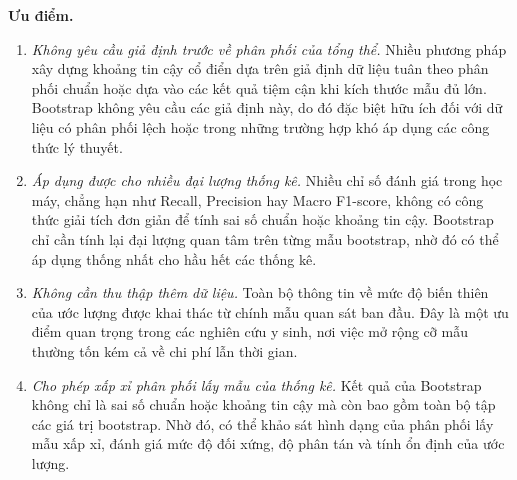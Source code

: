 \documentclass[14pt,a4paper]{extarticle}\usepackage[]{graphicx}\usepackage[]{xcolor}
\begin{document}
\textbf{Ưu điểm.}
\begin{enumerate}
  \item \emph{Không yêu cầu giả định trước về phân phối của tổng thể.}
        Nhiều phương pháp xây dựng khoảng tin cậy cổ điển dựa trên giả định
        dữ liệu tuân theo phân phối chuẩn hoặc dựa vào các kết quả tiệm cận
        khi kích thước mẫu đủ lớn. Bootstrap không yêu cầu các giả định này,
        do đó đặc biệt hữu ích đối với dữ liệu có phân phối lệch hoặc trong
        những trường hợp khó áp dụng các công thức lý thuyết.

  \item \emph{Áp dụng được cho nhiều đại lượng thống kê.} Nhiều chỉ số đánh
        giá trong học máy, chẳng hạn như Recall, Precision hay Macro F1-score,
        không có công thức giải tích đơn giản để tính sai số chuẩn hoặc khoảng
        tin cậy. Bootstrap chỉ cần tính lại đại lượng quan tâm trên từng mẫu
        bootstrap, nhờ đó có thể áp dụng thống nhất cho hầu hết các thống kê.

  \item \emph{Không cần thu thập thêm dữ liệu.} Toàn bộ thông tin về mức độ
        biến thiên của ước lượng được khai thác từ chính mẫu quan sát ban đầu.
        Đây là một ưu điểm quan trọng trong các nghiên cứu y sinh, nơi việc
        mở rộng cỡ mẫu thường tốn kém cả về chi phí lẫn thời gian.

  \item \emph{Cho phép xấp xỉ phân phối lấy mẫu của thống kê.} Kết quả của
        Bootstrap không chỉ là sai số chuẩn hoặc khoảng tin cậy mà còn bao
        gồm toàn bộ tập các giá trị bootstrap. Nhờ đó, có thể khảo sát hình
        dạng của phân phối lấy mẫu xấp xỉ, đánh giá mức độ đối xứng, độ phân
        tán và tính ổn định của ước lượng.
\end{enumerate}
\end{document}
